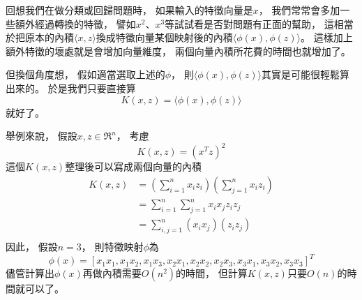   回想我們在做分類或回歸問題時，
  如果輸入的特徵向量是$x$，
  我們常常會多加一些額外經過轉換的特徵，
  譬如$x^2$、$x^3$等試試看是否對問題有正面的幫助，
  這相當於把原本的內積$\langle x, z \rangle$換成特徵向量某個映射後的內積$\langle \phi(x), \phi(z) \rangle$。
  這樣加上額外特徵的壞處就是會增加向量維度，
  兩個向量內積所花費的時間也就增加了。
  
  但換個角度想，
  假如適當選取上述的$\phi$，
  則$\langle \phi(x), \phi(z) \rangle$其實是可能很輕鬆算出來的。
  於是我們只要直接算
  \begin{equation}
    K(x, z) = \langle \phi(x), \phi(z) \rangle
  \end{equation}
  就好了。

  舉例來說，
  假設$x, z \in \mathfrak{R}^n$，
  考慮
  \begin{equation}
    K(x, z) = (x^T z)^2
  \end{equation}
  這個$K(x, z)$整理後可以寫成兩個向量的內積
  \begin{equation}
    \begin{split}
      K(x, z) 
      & = \left( \sum_{i=1}^n x_i z_i \right) \left( \sum_{j=1}^n x_i z_i \right) \\
      & = \sum_{i=1}^n \sum_{j=1}^n x_i x_j z_i z_j \\
      & = \sum_{i, j=1}^n (x_i x_j) (z_i z_j) \\
    \end{split}
  \end{equation}
  因此，
  假設$n = 3$，
  則特徵映射$\phi$為
  \begin{equation}
    \phi(x) =    	
    \left[ 
    x_1 x_1, 
      x_1 x_2,
      x_1 x_3,
      x_2 x_1,
      x_2 x_2,
      x_2 x_3,
      x_3 x_1,
      x_3 x_2,
      x_3 x_3
    \right]^T
  \end{equation}
  儘管計算出$\phi(x)$再做內積需要$O(n^2)$的時間，
  但計算$K(x,z)$只要$O(n)$的時間就可以了。

